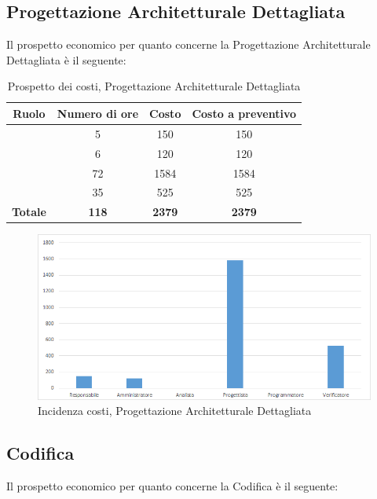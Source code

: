 \newpage
\subsection{Progettazione Architetturale Dettagliata}
Il prospetto economico per quanto concerne la Progettazione Architetturale Dettagliata è il seguente:


\begin{table}[H]
	\begin{center}
		\begin{tabular}{|c|c|c|c|}
			\hline
			\textbf{Ruolo}	& \textbf{Numero di ore} & \textbf{Costo} & \textbf{Costo a preventivo}\\
			\hline
			\Res	&	5  &	150	  &	150\\
			\hline
			\Amm	&	6  &	120  &	120	\\
			\hline
			\Prog	&	72  &	1584  &	1584	\\
			\hline
			\Ver	&	35  &	525  &	525	\\
			\hline
			\textbf{Totale}  & \textbf{118} &	\textbf{2379} &	\textbf{2379}	\\
			\hline
		\end{tabular}
	\end{center}
	\caption{Prospetto dei costi, Progettazione Architetturale Dettagliata }
\end{table}

\begin{figure}[H]
	\centering
	\includegraphics[scale=0.6]{img/8-3.png}
	\caption{Incidenza costi, Progettazione Architetturale Dettagliata}
\end{figure}

\newpage
\subsection{Codifica}
Il prospetto economico per quanto concerne la Codifica è il seguente:


